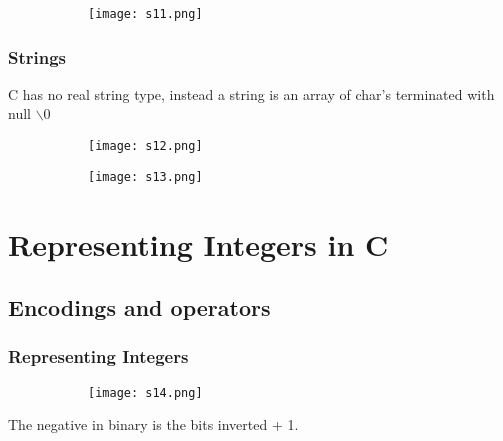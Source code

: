 \documentclass[8pt]{extreport}
\begin{document}
\begin{figure}[H]
\centering
\begin{subfigure}[b]{0.4\linewidth}
\texttt{[image: s11.png]}
\end{subfigure}
\end{figure}

\subsection{Strings}
C has no real string type, instead a string is an array of char's terminated with null $\backslash0$
\begin{figure}[H]
\centering
\begin{subfigure}[b]{0.4\linewidth}
\texttt{[image: s12.png]}
\end{subfigure}
\begin{subfigure}[b]{0.4\linewidth}
\texttt{[image: s13.png]}
\end{subfigure}
\end{figure}

\chapter{ Representing Integers in C }

\section{ Encodings and operators }

\subsection{Representing Integers}
\begin{figure}[H]
\centering
\begin{subfigure}[b]{0.4\linewidth}
\texttt{[image: s14.png]}
\end{subfigure}
\end{figure}
The negative in binary is the bits inverted + 1.
\end{document}
